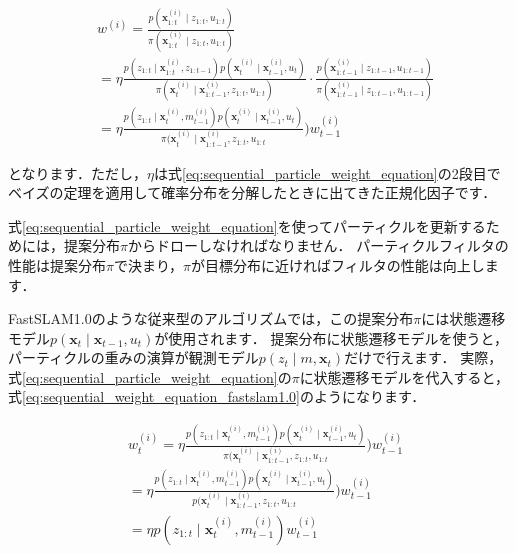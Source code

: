 \documentclass[{../../master}]{subfiles}
\begin{document}
\begin{equation}
  \begin{split}
    &w^{(i)} = \frac{p(\bm{x}_{1:t}^{(i)} \mid z_{1:t}, u_{1:t})}{\pi(\bm{x}_{1:t}^{(i)} \mid z_{1:t}, u_{1:t})} \\
    &= \eta \frac{p(z_{1:t} \mid \bm{x}_{1:t}^{(i)}, z_{1:t-1}) p(\bm{x}_{t}^{(i)} \mid \bm{x}_{t-1}^{(i)}, u_{t})}{\pi(\bm{x}_{t}^{(i)} \mid \bm{x}_{1:t-1}^{(i)}, z_{1:t}, u_{1:t})} \cdot \frac{p(\bm{x}_{1:t-1}^{(i)} \mid z_{1:t-1}, u_{1:t-1})}{\pi(\bm{x}_{1:t-1}^{(i)} \mid z_{1:t-1}, u_{1:t-1})} \\
    &= \eta \frac{p(z_{1:t} \mid \bm{x}_{t}^{(i)}, m_{t-1}^{(i)}) p(\bm{x}_{t}^{(i)} \mid \bm{x}_{t-1}^{(i)}, u_{t})}{\pi(\bm{x}_{t}^{(i)} \mid \bm{x}_{1:t-1}^{(i)}, z_{1:t}, u_{1:t}}) w_{t-1}^{(i)}
  \end{split}
  \label{eq:sequential_particle_weight_equation}
\end{equation}

\noindent
となります．ただし，$\eta$は式\ref{eq:sequential_particle_weight_equation}の2段目でベイズの定理を適用して確率分布を分解したときに出てきた正規化因子です．

式\ref{eq:sequential_particle_weight_equation}を使ってパーティクルを更新するためには，提案分布$\pi$からドローしなければなりません．
パーティクルフィルタの性能は提案分布$\pi$で決まり，$\pi$が目標分布に近ければフィルタの性能は向上します．

FastSLAM1.0のような従来型のアルゴリズムでは，この提案分布$\pi$には状態遷移モデル$p(\bm{x}_{t} \mid \bm{x}_{t-1}, u_{t})$が使用されます．
提案分布に状態遷移モデルを使うと，パーティクルの重みの演算が観測モデル$p(z_{t} \mid m, \bm{x}_{t})$だけで行えます．
実際，式\ref{eq:sequential_particle_weight_equation}の$\pi$に状態遷移モデルを代入すると，式\ref{eq:sequential_weight_equation_fastslam1.0}のようになります．

\begin{equation}
  \begin{split}
    &w_{t}^{(i)} = \eta \frac{p(z_{1:t} \mid \bm{x}_{t}^{(i)}, m_{t-1}^{(i)}) p(\bm{x}_{t}^{(i)} \mid \bm{x}_{t-1}^{(i)}, u_{t})}{\pi(\bm{x}_{t}^{(i)} \mid \bm{x}_{1:t-1}^{(i)}, z_{1:t}, u_{1:t}}) w_{t-1}^{(i)} \\
    &= \eta \frac{p(z_{1:t} \mid \bm{x}_{t}^{(i)}, m_{t-1}^{(i)}) p(\bm{x}_{t}^{(i)} \mid \bm{x}_{t-1}^{(i)}, u_{t})}{p(\bm{x}_{t}^{(i)} \mid \bm{x}_{1:t-1}^{(i)}, z_{1:t}, u_{1:t}}) w_{t-1}^{(i)} \\
    &= \eta p(z_{1:t} \mid \bm{x}_{t}^{(i)}, m_{t-1}^{(i)}) w_{t-1}^{(i)}
  \end{split}
  \label{eq:sequential_weight_equation_fastslam1.0}
\end{equation}
\end{document}
